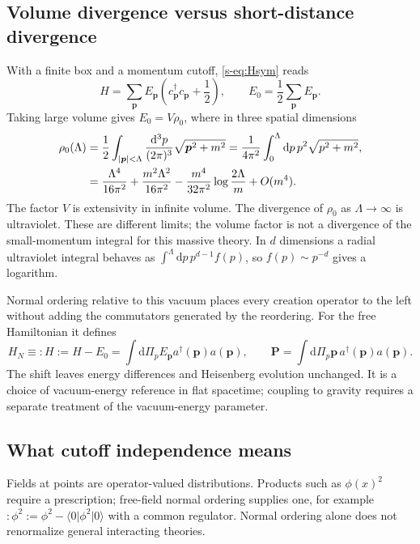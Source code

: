 \documentclass[11pt]{article}
\newcommand{\dd}{\mathrm{d}}
\newcommand{\vac}{\lvert0\rangle}
\newcommand{\vbra}{\langle0\rvert}
\begin{document}
\subsection{Volume divergence versus short-distance divergence}
With a finite box and a momentum cutoff, \eqref{s-eq:Hsym} reads
\begin{equation}
 H=\sum_{\bm p}E_{\bm p}\left(c_{\bm p}^\dagger c_{\bm p}+\frac12\right),
 \qquad E_0=\frac12\sum_{\bm p}E_{\bm p}.
 \label{s-eq:vacuumenergy}
\end{equation}
Taking large volume gives \(E_0=V\rho_0\), where in three spatial dimensions
\begin{align}
 \rho_0(\Lambda)&=\frac12\int_{|\bm p|<\Lambda}
   \frac{\dd^3p}{(2\pi)^3}\sqrt{\bm p^2+m^2}
   =\frac{1}{4\pi^2}\int_0^\Lambda\dd p\,p^2\sqrt{p^2+m^2},\notag\\
 &=\frac{\Lambda^4}{16\pi^2}
   +\frac{m^2\Lambda^2}{16\pi^2}
   -\frac{m^4}{32\pi^2}\log\frac{2\Lambda}{m}+O(m^4).
 \label{s-eq:rho}
\end{align}
The factor \(V\) is extensivity in infinite volume. The divergence of
\(\rho_0\) as \(\Lambda\to\infty\) is ultraviolet. These are different
limits; the volume factor is not a divergence of the small-momentum
integral for this massive theory. In \(d\) dimensions a radial ultraviolet
integral behaves as \(\int^\Lambda\dd p\,p^{d-1}f(p)\), so \(f(p)\sim p^{-d}\)
gives a logarithm.

Normal ordering relative to this vacuum places every creation operator
to the left without adding the commutators generated by the reordering.
For the free Hamiltonian it defines
\begin{equation}
 H_N\equiv:H:=H-E_0=\int\dd\Pi_p E_{\bm p}a^\dagger(\bm p)a(\bm p),
 \qquad \bm P=\int\dd\Pi_p\bm p\,a^\dagger(\bm p)a(\bm p).
 \label{s-eq:normalH}
\end{equation}
The shift leaves energy differences and Heisenberg evolution unchanged.
It is a choice of vacuum-energy reference in flat spacetime; coupling to
gravity requires a separate treatment of the vacuum-energy parameter.

\subsection{What cutoff independence means}
Fields at points are operator-valued distributions. Products such as
\(\phi(x)^2\) require a prescription; free-field normal ordering supplies
one, for example \(:\phi^2:=\phi^2-\vbra\phi^2\vac\) with a common regulator.
Normal ordering alone does not renormalize general interacting theories.
\end{document}
